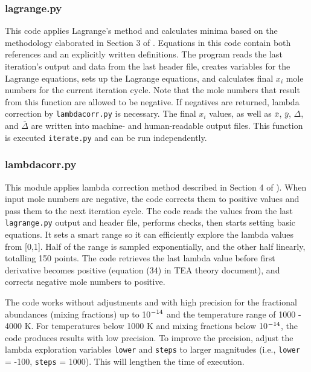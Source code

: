 \subsubsection{lagrange.py}

This code applies Lagrange's method and calculates minima based on the
methodology elaborated in Section 3
of \citet{BlecicEtal2016-TEAtheory}. Equations in this code contain
both references and an explicitly written definitions.  The program
reads the last iteration's output and data from the last header file,
creates variables for the Lagrange equations, sets up the Lagrange
equations, and calculates final $x_i$ mole numbers for the current
iteration cycle. Note that the mole numbers that result from this
function are allowed to be negative. If negatives are returned, lambda
correction by
\texttt{lambdacorr.py} is necessary. The final $x_i$ values, as well as 
$\bar{x}$, $\bar{y}$, $\Delta$, and $\bar\Delta$ are written into
machine- and human-readable output files. This function is
executed \texttt{iterate.py} and can be run independently.


\subsubsection{lambdacorr.py}

This module applies lambda correction method described in Section 4
of \citealp{BlecicEtal2016-TEAtheory}). When input mole numbers are
negative, the code corrects them to positive values and pass them to
the next iteration cycle. The code reads the values from the last
\texttt{lagrange.py} output and header file, performs
checks, then starts setting basic equations. It sets a smart range so
it can efficiently explore the lambda values from [0,1]. Half of the
range is sampled exponentially, and the other half linearly, totalling
150 points. The code retrieves the last lambda value before first
derivative becomes positive (equation (34) in TEA theory document),
and corrects negative mole numbers to positive.

The code works without adjustments and with high precision for the
fractional abundances (mixing fractions) up to 10$\sp{-14}$ and the
temperature range of 1000 - 4000 K. For temperatures below 1000 K and
mixing fractions below 10$\sp{-14}$, the code produces results with
low precision. To improve the precision, adjust the lambda exploration
variables \texttt{lower} and \texttt{steps} to larger magnitudes
(i.e., \texttt{lower} = -100, \texttt{steps} = 1000). This will
lengthen the time of execution.


